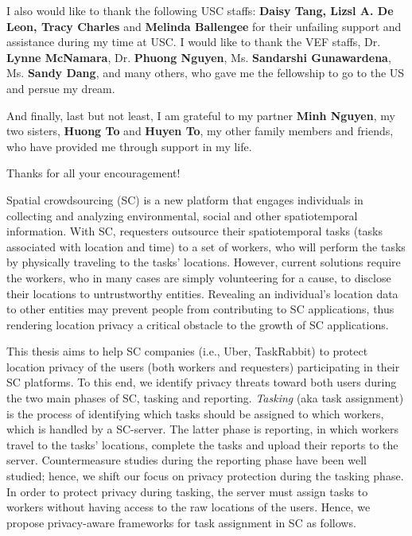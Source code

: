 \documentclass{USC-Thesis}
\renewcommand\bf\bfseries
\numberwithin{equation}{chapter}
\begin{document}
I also would like to thank the following USC staffs: {\bf Daisy Tang, Lizsl A. De Leon, Tracy Charles} and {\bf Melinda Ballengee} for their unfailing support and assistance during my time at USC.
I would like to thank the VEF staffs, Dr. \textbf{Lynne McNamara}, Dr. \textbf{Phuong Nguyen}, Ms. \textbf{Sandarshi Gunawardena}, Ms. \textbf{Sandy Dang}, and many others, who gave me the fellowship to go to the US and persue my dream.

And finally, last but not least, I am grateful to my partner {\bf Minh Nguyen}, my two sisters, {\bf Huong To} and {\bf Huyen To}, my other family members and friends, who have provided me through support in my life.

Thanks for all your encouragement!

\tableofcontents
\listoftables
\listoffigures

\mainmatter
\newtheorem{lemma}{Lemma}


Spatial crowdsourcing (SC) is a new platform that engages individuals in collecting and analyzing environmental, social and other spatiotemporal information. With SC, requesters outsource their spatiotemporal tasks (tasks associated with location and time) to a set of workers, who will perform the tasks by physically traveling to the tasks' locations. However, current solutions require the workers, who in many cases are simply volunteering for a cause, to disclose their locations to untrustworthy entities. Revealing an individual's location data to other entities may prevent people from contributing to SC applications, thus rendering location privacy a critical obstacle to the growth of SC applications.

This thesis aims to help SC companies (i.e., Uber, TaskRabbit) to protect location privacy of the users (both workers and requesters) participating in their SC platforms. To this end, we identify privacy threats toward both users during the two main phases of SC, tasking and reporting. \emph{Tasking} (aka task assignment) is the process of identifying which tasks should be assigned to which workers, which is handled by a SC-server. The latter phase is reporting, in which workers travel to the tasks' locations, complete the tasks and upload their reports to the server. Countermeasure studies during the reporting phase have been well studied; hence, we shift our focus on privacy protection during the tasking phase. In order to protect privacy during tasking, the server must assign tasks to workers without having access to the raw locations of the users. Hence, we propose privacy-aware frameworks for task assignment in SC as follows.
\end{document}
